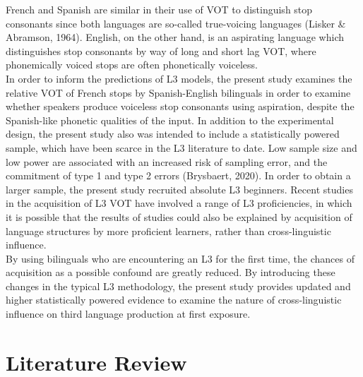 \documentclass[
  english,
  man]{apa6}
\begin{document}
French and Spanish are similar in their use of VOT to distinguish stop consonants since both languages are so-called true-voicing languages (Lisker \& Abramson, 1964).
English, on the other hand, is an aspirating language which distinguishes stop consonants by way of long and short lag VOT, where phonemically voiced stops are often phonetically voiceless.\\
In order to inform the predictions of L3 models, the present study examines the relative VOT of French stops by Spanish-English bilinguals in order to examine whether speakers produce voiceless stop consonants using aspiration, despite the Spanish-like phonetic qualities of the input.
In addition to the experimental design, the present study also was intended to include a statistically powered sample, which have been scarce in the L3 literature to date.
Low sample size and low power are associated with an increased risk of sampling error, and the commitment of type 1 and type 2 errors (Brysbaert, 2020).
In order to obtain a larger sample, the present study recruited absolute L3 beginners.
Recent studies in the acquisition of L3 VOT have involved a range of L3 proficiencies, in which it is possible that the results of studies could also be explained by acquisition of language structures by more proficient learners, rather than cross-linguistic influence.\\
By using bilinguals who are encountering an L3 for the first time, the chances of acquisition as a possible confound are greatly reduced. By introducing these changes in the typical L3 methodology, the present study provides updated and higher statistically powered evidence to examine the nature of cross-linguistic influence on third language production at first exposure.

\hypertarget{literature-review}{%
\section{Literature Review}\label{literature-review}}
\end{document}
